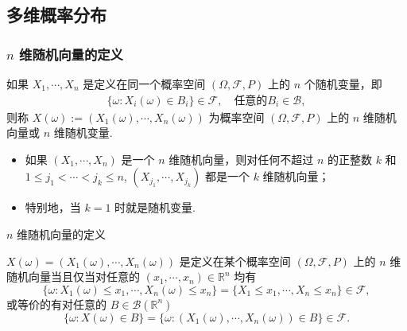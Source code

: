 \subsection{多维概率分布}
\begin{frame}
  \frametitle{$n$ 维随机向量的定义}
  \begin{defi}[$n$ 维随机向量或随机变量] 如果 $X_1,\cdots, X_n$ 是定义在同一个概率空间 $(\Omega,\mathcal{F},P)$ 上的 $n$ 个随机变量，即
    \begin{eqnarray*}
      \{\omega:X_i (\omega)\in B_i\}\in \mathcal{F}, \quad \mbox{任意的} B_i\in \mathcal{B},
    \end{eqnarray*}
    则称 $X (\omega):=(X_1 (\omega),\cdots,X_n (\omega))$ 为概率空间 $(\Omega,\mathcal{F},P)$ 上的 $n$ 维随机向量或 $n$ 维随机变量.
  \end{defi}

\vspace{0.2cm}
\begin{rmk}
	\begin{itemize}[<+-|alert@+>]
		\item 如果 $\left (X_1,\cdots ,X_n \right) $ 是一个 $n$ 维随机向量，则对任何不超过 $n$ 的正整数 $k$ 和 $1\leqslant j_1<\cdots <j_k\leqslant n$, $\left ( X_{j_1},\cdots ,X_{j_k} \right) $
		都是一个 $k$ 维随机向量；
		\item 特别地，当 $k=1$ 时就是随机变量.
	\end{itemize}

\end{rmk}

\end{frame}
\begin{frame}{$n$ 维随机向量的定义}


	\begin{thm}
		$X (\omega)=(X_1 (\omega),\cdots,X_n (\omega))$ 是定义在某个概率空间 $(\Omega,\mathcal{F},P)$ 上的 $n$ 维随机向量当且仅当对任意的 $(x_1,\cdots, x_n)\in \mathbb{R}^ n$ 均有
		\[\{\omega: X_1(\omega)\leq x_1,\cdots, X_n(\omega)\leq x_n\}=\{X_1\leq x_1,\cdots, X_n\leq x_n\}\in\mathcal{F},\]
		或等价的有对任意的 $B\in\mathcal{B}(\mathbb{R}^ n)$
		\[\{\omega: X(\omega)\in B\}=\{\omega: (X_1(\omega),\cdots,X_n(\omega))\in B\}\in\mathcal{F}.\]
	\end{thm}


\end{frame}

